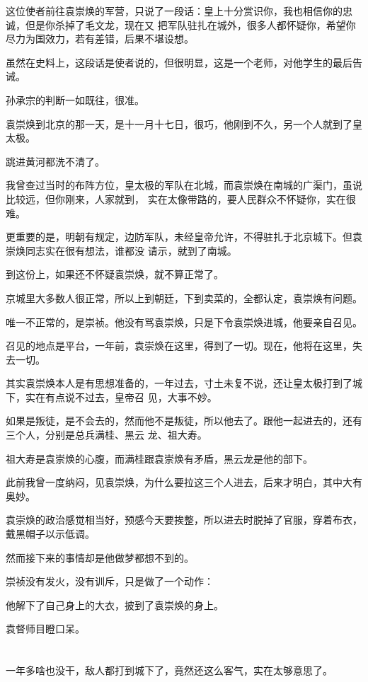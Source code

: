 \documentclass[11pt,a4paper,onecolumn]{article}
\begin{document}
这位使者前往袁崇焕的军营，只说了一段话：皇上十分赏识你，我也相信你的忠诚，但是你杀掉了毛文龙，现在又
把军队驻扎在城外，很多人都怀疑你，希望你尽力为国效力，若有差错，后果不堪设想。

虽然在史料上，这段话是使者说的，但很明显，这是一个老师，对他学生的最后告诫。

孙承宗的判断一如既往，很准。

袁崇焕到北京的那一天，是十一月十七日，很巧，他刚到不久，另一个人就到了\myrule 皇太极。

跳进黄河都洗不清了。

我曾查过当时的布阵方位，皇太极的军队在北城，而袁崇焕在南城的广渠门，虽说比较远，但你刚来，人家就到，
实在太像带路的，要人民群众不怀疑你，实在很难。

更重要的是，明朝有规定，边防军队，未经皇帝允许，不得驻扎于北京城下。但袁崇焕同志实在很有想法，谁都没
请示，就到了南城。

到这份上，如果还不怀疑袁崇焕，就不算正常了。

京城里大多数人很正常，所以上到朝廷，下到卖菜的，全都认定，袁崇焕有问题。

唯一不正常的，是崇祯。他没有骂袁崇焕，只是下令袁崇焕进城，他要亲自召见。

召见的地点是平台，一年前，袁崇焕在这里，得到了一切。现在，他将在这里，失去一切。

其实袁崇焕本人是有思想准备的，一年过去，寸土未复不说，还让皇太极打到了城下，实在有点说不过去，皇帝召
见，大事不妙。

如果是叛徒，是不会去的，然而他不是叛徒，所以他去了。跟他一起进去的，还有三个人，分别是总兵满桂、黑云
龙、祖大寿。

祖大寿是袁崇焕的心腹，而满桂跟袁崇焕有矛盾，黑云龙是他的部下。

此前我曾一度纳闷，见袁崇焕，为什么要拉这三个人进去，后来才明白，其中大有奥妙。

袁崇焕的政治感觉相当好，预感今天要挨整，所以进去时脱掉了官服，穿着布衣，戴黑帽子以示低调。

然而接下来的事情却是他做梦都想不到的。

崇祯没有发火，没有训斥，只是做了一个动作：

他解下了自己身上的大衣，披到了袁崇焕的身上。

袁督师目瞪口呆。

\section[\thesection]{}

一年多啥也没干，敌人都打到城下了，竟然还这么客气，实在太够意思了。
\end{document}
